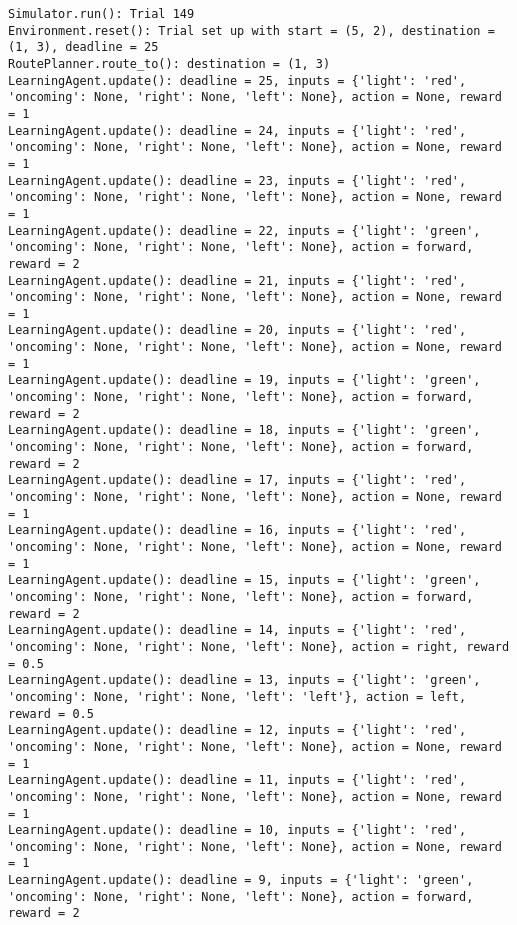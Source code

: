 \documentclass{article}
\begin{document}
\begin{verbatim}
Simulator.run(): Trial 149
Environment.reset(): Trial set up with start = (5, 2), destination = (1, 3), deadline = 25
RoutePlanner.route_to(): destination = (1, 3)
LearningAgent.update(): deadline = 25, inputs = {'light': 'red', 'oncoming': None, 'right': None, 'left': None}, action = None, reward = 1
LearningAgent.update(): deadline = 24, inputs = {'light': 'red', 'oncoming': None, 'right': None, 'left': None}, action = None, reward = 1
LearningAgent.update(): deadline = 23, inputs = {'light': 'red', 'oncoming': None, 'right': None, 'left': None}, action = None, reward = 1
LearningAgent.update(): deadline = 22, inputs = {'light': 'green', 'oncoming': None, 'right': None, 'left': None}, action = forward, reward = 2
LearningAgent.update(): deadline = 21, inputs = {'light': 'red', 'oncoming': None, 'right': None, 'left': None}, action = None, reward = 1
LearningAgent.update(): deadline = 20, inputs = {'light': 'red', 'oncoming': None, 'right': None, 'left': None}, action = None, reward = 1
LearningAgent.update(): deadline = 19, inputs = {'light': 'green', 'oncoming': None, 'right': None, 'left': None}, action = forward, reward = 2
LearningAgent.update(): deadline = 18, inputs = {'light': 'green', 'oncoming': None, 'right': None, 'left': None}, action = forward, reward = 2
LearningAgent.update(): deadline = 17, inputs = {'light': 'red', 'oncoming': None, 'right': None, 'left': None}, action = None, reward = 1
LearningAgent.update(): deadline = 16, inputs = {'light': 'red', 'oncoming': None, 'right': None, 'left': None}, action = None, reward = 1
LearningAgent.update(): deadline = 15, inputs = {'light': 'green', 'oncoming': None, 'right': None, 'left': None}, action = forward, reward = 2
LearningAgent.update(): deadline = 14, inputs = {'light': 'red', 'oncoming': None, 'right': None, 'left': None}, action = right, reward = 0.5
LearningAgent.update(): deadline = 13, inputs = {'light': 'green', 'oncoming': None, 'right': None, 'left': 'left'}, action = left, reward = 0.5
LearningAgent.update(): deadline = 12, inputs = {'light': 'red', 'oncoming': None, 'right': None, 'left': None}, action = None, reward = 1
LearningAgent.update(): deadline = 11, inputs = {'light': 'red', 'oncoming': None, 'right': None, 'left': None}, action = None, reward = 1
LearningAgent.update(): deadline = 10, inputs = {'light': 'red', 'oncoming': None, 'right': None, 'left': None}, action = None, reward = 1
LearningAgent.update(): deadline = 9, inputs = {'light': 'green', 'oncoming': None, 'right': None, 'left': None}, action = forward, reward = 2

\end{verbatim}
\end{document}

